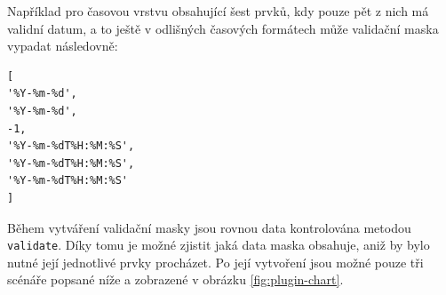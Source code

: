 Například pro časovou vrstvu obsahující šest prvků, kdy pouze pět
z nich má validní datum, a to ještě v odlišných časových formátech
může validační maska vypadat následovně:

\begin{verbatim}
[
'%Y-%m-%d',
'%Y-%m-%d',
-1,
'%Y-%m-%dT%H:%M:%S',
'%Y-%m-%dT%H:%M:%S',
'%Y-%m-%dT%H:%M:%S'
]
\end{verbatim}

Během vytváření validační masky jsou rovnou data kontrolována metodou
\verb|validate|. Díky tomu je možné zjistit jaká data maska obsahuje,
aniž by bylo nutné její jednotlivé prvky procházet. Po její vytvoření
jsou možné pouze tři scénáře popsané níže a zobrazené v obrázku
\ref{fig:plugin-chart}.


